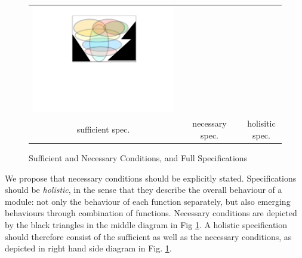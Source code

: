 \begin{figure}[htb]
\begin{tabular}{ccccc}
\begin{minipage}{0.25\textwidth}
 \includegraphics[width=\linewidth, trim=250  320 260 60,clip]{diagrams/NecAndSuff.pdf}
\end{minipage}
\\
sufficient  spec.& & necessary spec. & & holisitic spec.
 \end{tabular}
  \vspace*{-2.5mm}
  \caption{Sufficient and Necessary Conditions, and Full Specifications}
 \label{fig:NecessaryAndSuff}
 \end{figure}
 
 We propose that  necessary conditions should be explicitly stated. Specifications should be \emph{holistic}, in the sense that they describe the  overall behaviour of a module: not only the behaviour  of each function separately, but also 
 emerging behaviours through combination of functions.
 Necessary conditions are  depicted by the black
 triangles in the middle  diagram in Fig \ref{fig:NecessaryAndSuff}.
A holistic specification should therefore consist of   the sufficient as well as the necessary conditions, as  
depicted in right hand side  diagram in Fig. \ref{fig:NecessaryAndSuff}.


